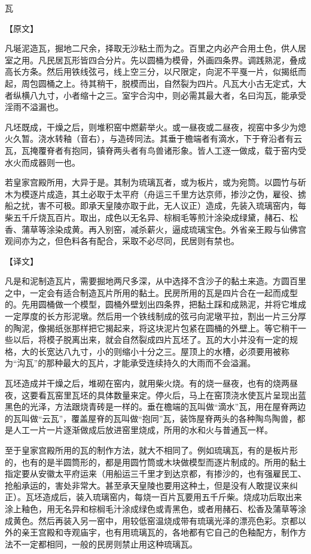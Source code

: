 \documentclass[12pt,UTF8]{ctexbook}
\begin{document}
瓦

【原文】

凡埏泥造瓦，掘地二尺余，择取无沙粘土而为之。百里之内必产合用土色，供人居室之用。凡民居瓦形皆四合分片。先以圆桶为模骨，外画四条界。调践熟泥，叠成高长方条。然后用铁线弦弓，线上空三分，以尺限定，向泥不平戛一片，似揭纸而起，周包圆桶之上。待其稍干，脱模而出，自然裂为四片。凡瓦大小古无定式，大者纵横八九寸，小者缩十之三。室宇合沟中，则必需其最大者，名曰沟瓦，能承受淫雨不溢漏也。

凡坯既成，干燥之后，则堆积窑中燃薪举火。或一昼夜或二昼夜，视窑中多少为熄火久暂。浇水转釉（音右），与造砖同法。其垂于檐端者有滴水，下于脊沿者有云瓦，瓦掩覆脊者有抱同，镇脊两头者有鸟兽诸形象。皆人工逐一做成，载于窑内受水火而成器则一也。

若皇家宫殿所用，大异于是。其制为琉璃瓦者，或为板片，或为宛筒。以圆竹与斫木为模逐片成造，其土必取于太平府（舟运三千里方达京师，掺沙之伪，雇役、掳船之扰，害不可极。即承天皇陵亦取于此，无人议正）造成，先装入琉璃窑内，每柴五千斤烧瓦百片。取出，成色以无名异、棕榈毛等煎汁涂染成绿黛，赭石、松香、蒲草等涂染成黄。再入别窑，减杀薪火，逼成琉璃宝色。外省亲王殿与仙佛宫观间亦为之，但色料各有配合，采取不必尽同，民居则有禁也。

【译文】

凡是和泥制造瓦片，需要掘地两尺多深，从中选择不含沙子的黏土来造。方圆百里之中，一定会有适合制造瓦片所用的黏土。民房所用的瓦是四片合在一起而成型的。先用圆桶做一个模型，圆桶外壁划出四条界，把黏土踩和成熟泥，并将它堆成一定厚度的长方形泥墩。然后用一个铁线制成的弦弓向泥墩平拉，割出一片三分厚的陶泥，像揭纸张那样把它揭起来，将这块泥片包紧在圆桶的外壁上。等它稍干一些以后，将模子脱离出来，就会自然裂成四片瓦坯了。瓦的大小并没有一定的规格，大的长宽达八九寸，小的则缩小十分之三。屋顶上的水槽，必须要用被称为“沟瓦”的那种最大的瓦片，才能承受连续持久的大雨而不会溢漏。

瓦坯造成并干燥之后，堆砌在窑内，就用柴火烧。有的烧一昼夜，也有的烧两昼夜，这要看瓦窑里瓦坯的具体数量来定。停火后，马上在窑顶浇水使瓦片呈现出蓝黑色的光泽，方法跟烧青砖是一样的。垂在檐端的瓦叫做“滴水”瓦，用在屋脊两边的瓦叫做“云瓦”，覆盖屋脊的瓦叫做“抱同”瓦，装饰屋脊两头的各种陶鸟陶兽，都是人工一片一片逐渐做成后放进窑里烧成，所用的水和火与普通瓦一样。

至于皇家宫殿所用的瓦的制作方法，就大不相同了。例如琉璃瓦，有的是板片形的，也有的是半圆筒形的，都是用圆竹筒或木块做模型而逐片制成的。所用的黏土指定要从安徽太平府运来（用船运三千里才到达京都，有掺沙的，也有强雇民工、抢船承运的，害处非常大。甚至承天皇陵也要用这种土，但是没有人敢提议来纠正）。瓦坯造成后，装入琉璃窑内，每烧一百片瓦要用五千斤柴。烧成功后取出来涂上釉色，用无名异和棕榈毛汁涂成绿色或青黑色，或者用赭石、松香及蒲草等涂成黄色。然后再装入另一窑中，用较低窑温烧成带有琉璃光泽的漂亮色彩。京都以外的亲王宫殿和寺观庙宇，也有用琉璃瓦的，各地都有它自己的色釉配方，制作方法不一定都相同，一般的民房则禁止用这种琉璃瓦。
\end{document}
